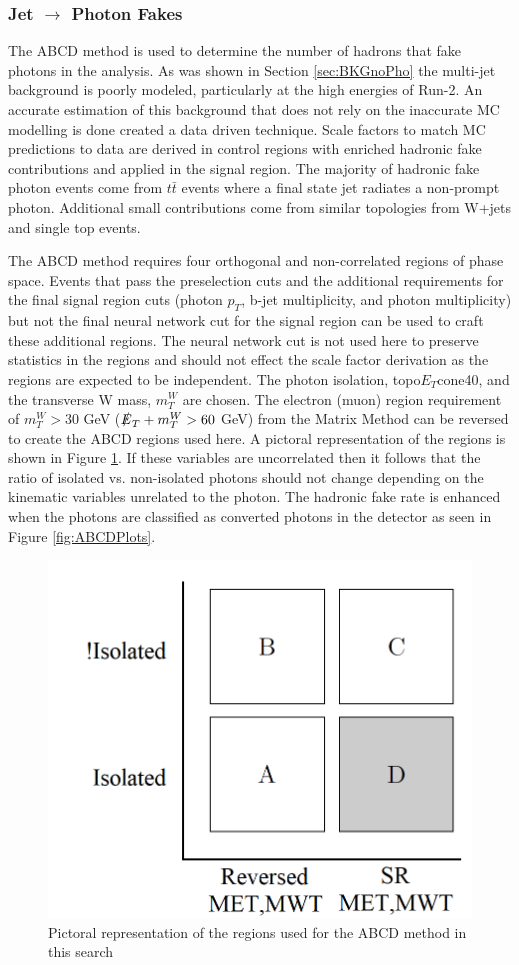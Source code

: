 \subsubsection{Jet $\rightarrow$ Photon Fakes}
\label{sec:FakePho2}

The ABCD method is used to determine the number of hadrons that fake photons in the analysis.  As was shown in Section \ref{sec:BKGnoPho} the multi-jet background is poorly modeled, particularly at the high energies of Run-2.  An accurate estimation of this background that does not rely on the inaccurate MC modelling is done created a data driven technique.  Scale factors to match MC predictions to data are derived in control regions with enriched hadronic fake contributions and applied in the signal region.  The majority of hadronic fake photon events come from $t\bar{t}$ events where a final state jet radiates a non-prompt photon.  Additional small contributions come from similar topologies from W+jets and single top events.  

The ABCD method requires four orthogonal and non-correlated regions of phase space.  Events that pass the preselection cuts and the additional requirements for the final signal region cuts (photon $p_T$, b-jet multiplicity, and photon multiplicity) but not the final neural network cut for the signal region can be used to craft these additional regions.  The neural network cut is not used here to preserve statistics in the regions and should not effect the scale factor derivation as the regions are expected to be independent.  The photon isolation,  topo$E_{T}$cone40, and the transverse W mass, $m_T^W$ are chosen.  The electron (muon) region requirement of $m_T^W > 30$ GeV ($\slashed{E}_T + m_T^W > 60$ GeV) from the Matrix Method can be reversed to create the ABCD regions used here.  A pictoral representation of the regions is shown in Figure \ref{fig:ABCD}.  If these variables are uncorrelated then it follows that the ratio of isolated vs. non-isolated photons should not change depending on the kinematic variables unrelated to the photon.  The hadronic fake rate is enhanced when the photons are classified as converted photons in the detector as seen in Figure \ref{fig:ABCDPlots}.

\begin{figure}[h!]
	\centering
	\includegraphics[width=.5\columnwidth]{../ThesisImages/SearchStrategy/ABCDpictoral.png}
	\caption{Pictoral representation of the regions used for the ABCD method in this search}
	\label{fig:ABCD}
\end{figure}


